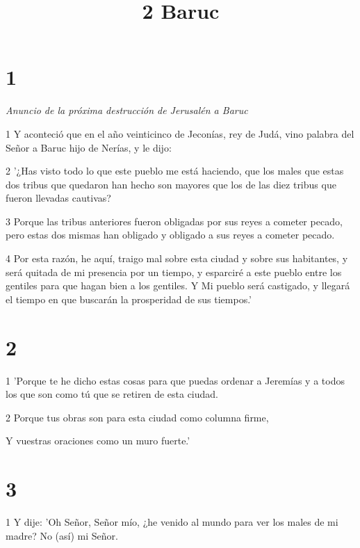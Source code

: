 

\title{2 Baruc}

\chapter{1}

\par \textit{Anuncio de la próxima destrucción de Jerusalén a Baruc}

\par 1 Y aconteció que en el año veinticinco de Jeconías, rey de Judá, vino palabra del Señor a Baruc hijo de Nerías, y le dijo:

\par 2 '¿Has visto todo lo que este pueblo me está haciendo, que los males que estas dos tribus que quedaron han hecho son mayores que los de las diez tribus que fueron llevadas cautivas?

\par 3 Porque las tribus anteriores fueron obligadas por sus reyes a cometer pecado, pero estas dos mismas han obligado y obligado a sus reyes a cometer pecado.

\par 4 Por esta razón, he aquí, traigo mal sobre esta ciudad y sobre sus habitantes, y será quitada de mi presencia por un tiempo, y esparciré a este pueblo entre los gentiles para que hagan bien a los gentiles. Y Mi pueblo será castigado, y llegará el tiempo en que buscarán la prosperidad de sus tiempos.'

\chapter{2}

\par 1 'Porque te he dicho estas cosas para que puedas ordenar a Jeremías y a todos los que son como tú que se retiren de esta ciudad.

\par 2 Porque tus obras son para esta ciudad como columna firme,

Y vuestras oraciones como un muro fuerte.'

\chapter{3}

\par 1 Y dije: 'Oh Señor, Señor mío, ¿he venido al mundo para ver los males de mi madre? No (así) mi Señor.


